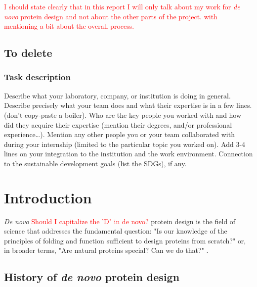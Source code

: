 \documentclass[11pt,a4paper]{article}
\begin{document}
\textcolor{red}{I should state clearly that in this report I will only talk about my work for \emph{de novo} protein design and not about the other parts of the project. with mentioning a bit about the overall process.}


\subsection{To delete}

\subsubsection{Task description}

Describe what your laboratory, company, or institution is doing in general. 
Describe precisely what your team does and what their expertise is in a few lines. (don't copy-paste a boiler).
Who are the key people you worked with and how did they acquire their expertise (mention their degrees, and/or 
professional experience…). Mention any other people you or your team collaborated with during your internship (limited to the particular topic you worked on). 
Add 3-4 lines on your integration to the institution and the work environment.
Connection to the sustainable development goals (list the SDGs), if any.



\section{Introduction}

\emph{De novo} \textcolor{red}{Should I capitalize the 'D" in de novo?} protein design is the field of science that addresses the 
fundamental question: "Is our knowledge of the principles of folding 
and function sufficient to design proteins from scratch?" 
\cite{korendovych2020novo} or, in broader terms, "Are natural proteins 
special? Can we do that?" \cite{hecht2018natural}.

\subsection{History of \emph{de novo} protein design}
\end{document}
